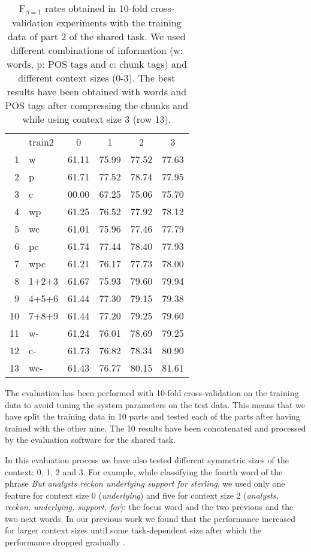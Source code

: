 \documentclass[11pt]{article}
\begin{document}
\begin{table}[t]
\begin{center}
\begin{tabular}{ r|l|c|c|c|c|}\cline{3-6}
\multicolumn{1}{l}{} & \multicolumn{1}{l|}{train2} & 
 0 & 1 & 2 & 3 \\\cline{2-6}
 1 & w         & 61.11 & 75.99 & 77.52 & 77.63\\
 2 & p         & 61.71 & 77.52 & 78.74 & 77.95\\
 3 & c         & 00.00 & 67.25 & 75.06 & 75.70\\
 4 & wp        & 61.25 & 76.52 & 77.92 & 78.12\\
 5 & wc        & 61.01 & 75.96 & 77.46 & 77.79\\
 6 & pc        & 61.74 & 77.44 & 78.40 & 77.93\\
 7 & wpc       & 61.21 & 76.17 & 77.73 & 78.00\\\cline{2-6}
 8 & 1+2+3     & 61.67 & 75.93 & 79.60 & 79.94\\
 9 & 4+5+6     & 61.44 & 77.30 & 79.15 & 79.38\\
10 & 7+8+9     & 61.44 & 77.20 & 79.25 & 79.60\\\cline{2-6}
11 & w-        & 61.24 & 76.01 & 78.69 & 79.25\\
12 & c-        & 61.73 & 76.82 & 78.34 & 80.90\\
13 & wc-       & 61.43 & 76.77 & 80.15 & 81.61\\\cline{2-6}
\end{tabular}
\end{center}
\caption{
F$_{\beta=1}$ rates obtained in 10-fold cross-validation experiments
with the training data of part 2 of the shared task.
We used different combinations of information (w: words, p: POS tags
and c: chunk tags) and different context sizes (0-3).
The best results have been obtained with words and POS tags after
compressing the chunks and while using context size 3 (row 13).
} 
\label{tab-result2}
\end{table}

The evaluation has been performed with 10-fold cross-validation on the
training data to avoid tuning the system parameters on the test data.
This means that we have split the training data in 10 parts and tested
each of the parts after having trained with the other nine.
The 10 results have been concatenated and processed by the evaluation
software for the shared task.

In this evaluation process we have also tested different symmetric
sizes of the context: 0, 1, 2 and 3.
For example, while classifying the fourth word of the phrase 
{\it But analysts reckon underlying support for sterling}, we
used only one feature for context size 0 ({\it underlying}) and
five for context size 2 ({\it analysts, reckon, underlying, support,
for}): the focus word and the two previous and the two next words.
In our previous work we found that the performance increased for
larger context sizes until some task-dependent size after which the
performance dropped gradually \cite{tks99}.
\end{document}
